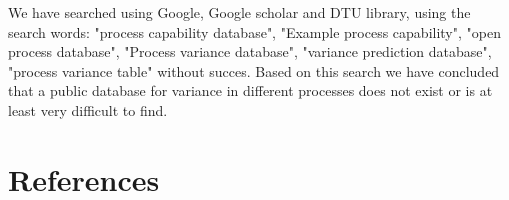 \documentclass[aip,amsmath,reprint, author-year]{revtex4-1}
\begin{document}
We have searched using Google, Google scholar and DTU library, using the search words: "process capability database", "Example process capability", "open process database", "Process variance database", "variance prediction database", "process variance table" without succes. 
Based on this search we have concluded that a public database for variance in different processes does not exist or is at least very difficult to find.

\section*{References}

\end{document}
